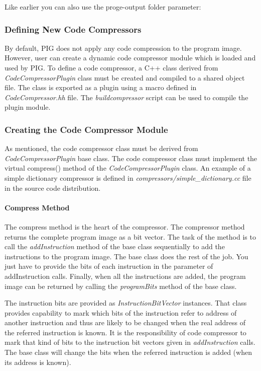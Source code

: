 \documentclass[twoside]{tceusermanual}
\begin{document}

Like earlier you can also use the proge-output folder parameter:


\subsubsection{Defining New Code Compressors}

By default, PIG does not apply any code compression to the program
image. However, user can create a dynamic code compressor module which
is loaded and used by PIG. To define a code compressor, a C++ class
derived from \emph{CodeCompressorPlugin} class must be created and
compiled to a shared object file. The class is exported as a plugin
using a macro defined in \emph{CodeCompressor.hh} file. The 
\emph{buildcompressor} script can be used to compile the plugin
module.

\subsubsection{Creating the Code Compressor Module}

As mentioned, the code compressor class must be derived from
\emph{CodeCompressorPlugin} base class. The code compressor class
must implement the virtual compress() method of the
\emph{CodeCompressorPlugin} class. An example of a simple dictionary
compressor is defined in \emph{compressors/simple\_dictionary.cc} file in the source code distribution.

\paragraph{Compress Method}

The compress method is the heart of the compressor. The compressor
method returns the complete program image as a bit vector. The task of
the method is to call the \emph{addInstruction} method of the base class
sequentially to add the instructions to the program image. The base
class does the rest of the job. You just have to provide the bits of
each instruction in the parameter of addInstruction calls. Finally,
when all the instructions are added, the program image can be returned
by calling the \emph{programBits} method of the base class.

The instruction bits are provided as \emph{InstructionBitVector}
instances. That class provides capability to mark which bits of the
instruction refer to address of another instruction and thus are
likely to be changed when the real address of the referred instruction
is known. It is the responsibility of code compressor to mark that
kind of bits to the instruction bit vectors given in \emph{addInstruction}
calls. The base class will change the bits when the referred
instruction is added (when its address is known).
\end{document}
